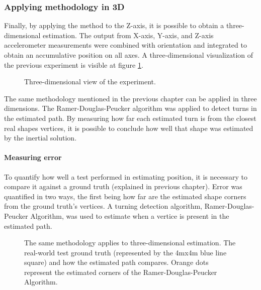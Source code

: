 \newpage

\subsubsection{Applying methodology in 3D}

Finally, by applying the method to the Z-axis, it is possible to obtain a  three-dimensional estimation. The output from X-axis, Y-axis, and Z-axis accelerometer measurements were combined with orientation and integrated to obtain an accumulative position on all axes.
A three-dimensional visualization of the previous experiment is visible at figure \ref{fig:square3D}.

\begin{figure}[!h]
    \centering
    \resizebox{0.8\linewidth}{!}{}
    \caption{Three-dimensional view of the experiment.}
    \label{fig:square3D}
\end{figure}

The same methodology mentioned in the previous chapter can be applied in three dimensions. The Ramer-Douglas-Peucker algorithm was applied to detect turns in the estimated path. By measuring how far each estimated turn is from the closest real shapes vertices, it is possible to conclude how well that shape was estimated by the inertial solution.

\paragraph{Measuring error}


To quantify how well a test performed in estimating position, it is necessary to compare it against a ground truth (explained in previous chapter). Error was quantified in two ways, the first being how far are the estimated shape corners from the ground truth's vertices. A turning detection algorithm, Ramer-Douglas-Peucker Algorithm, was used to estimate when a vertice is present in the estimated path.


\begin{figure}[!h]
    \centering
    \resizebox{0.8\linewidth}{!}{}
    \caption{The same methodology applies to three-dimensional estimation. The real-world test ground truth (represented by the 4mx4m  blue line square) and how the estimated path compares. Orange dots represent the estimated corners of the Ramer-Douglas-Peucker Algorithm.}
    \label{fig:square3D_truth}
\end{figure}

